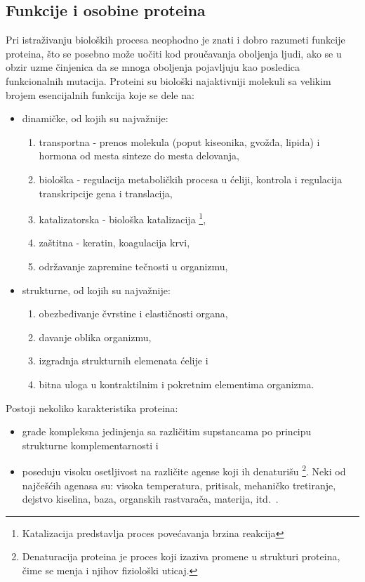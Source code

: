 \subsection{Funkcije i osobine proteina}
Pri istraživanju bioloških procesa neophodno je znati i dobro razumeti funkcije proteina, što se posebno može uočiti kod proučavanja oboljenja ljudi, ako se u obzir uzme činjenica da se mnoga oboljenja pojavljuju kao posledica funkcionalnih mutacija. Proteini su biološki najaktivniji molekuli sa velikim brojem esencijalnih funkcija koje se dele na:
\begin{itemize}
\item dinamičke, od kojih su najvažnije:
\begin{enumerate} 
\item transportna - prenos molekula (poput kiseonika, gvožđa, lipida) i hormona od mesta sinteze do mesta delovanja,
\item biološka - regulacija metaboličkih procesa u ćeliji, kontrola i regulacija transkripcije gena i translacija,
\item katalizatorska - biološka katalizacija \footnote{Katalizacija predstavlja proces povećavanja brzina reakcija},
\item zaštitna - keratin, koagulacija krvi,
\item održavanje zapremine tečnosti u organizmu,
\end{enumerate}
\item strukturne, od kojih su najvažnije:
\begin{enumerate}
\item obezbeđivanje čvrstine i elastičnosti organa,
\item davanje oblika organizmu,
\item izgradnja strukturnih elemenata ćelije i
\item bitna uloga u kontraktilnim i pokretnim elementima organizma.
\end{enumerate}
\end{itemize} 

Postoji nekoliko karakteristika proteina:
\begin{itemize}
\item grade kompleksna jedinjenja sa različitim supstancama po principu strukturne komplementarnosti i  
\item poseduju visoku osetljivost na različite agense koji ih denaturišu \footnote{Denaturacija proteina je proces koji izaziva promene u strukturi proteina, čime se menja i njihov fiziološki uticaj.}. Neki od najčešćih agenasa su: visoka temperatura, pritisak, mehaničko tretiranje, dejstvo kiselina, baza, organskih rastvarača, materija, itd.~\cite{spasic,JKd}.
\end{itemize}
 
